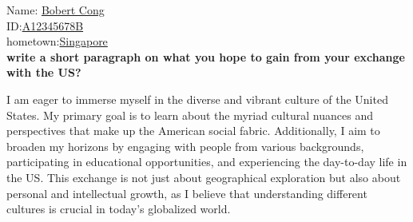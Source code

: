 \documentclass[11pt]{article}
\begin{document}

\vspace{0.5cm}

Name: \underline{Bobert Cong\hspace{2.3in}} \\
ID:\underline{A12345678B\hspace{2.55in}}\\
hometown:\underline{Singapore\hspace{2.45in}}\\
\textbf{write a short paragraph on what you hope to gain from your exchange with the US?}

I am eager to immerse myself in the diverse and vibrant culture of the United States. My primary goal is to learn about the myriad cultural nuances and perspectives that make up the American social fabric. Additionally, I aim to broaden my horizons by engaging with people from various backgrounds, participating in educational opportunities, and experiencing the day-to-day life in the US. This exchange is not just about geographical exploration but also about personal and intellectual growth, as I believe that understanding different cultures is crucial in today’s globalized world.
\end{document}
